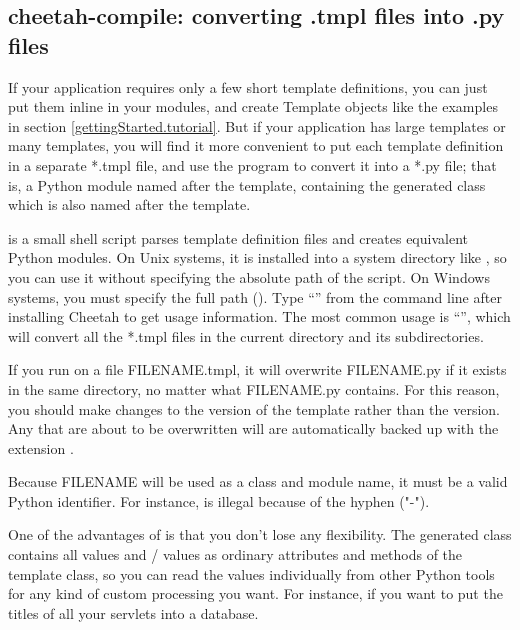 \subsection{cheetah-compile: converting .tmpl files into .py files}
\label{howWorks.tmpl2py}
\label{howWorks.cheetah-compile}

If your application requires only a few short template definitions, you can
just put them inline in your modules, and create Template objects like the
examples in section \ref{gettingStarted.tutorial}.  But if your application
has large templates or many templates, you will find it more convenient to
put each template definition in a separate *.tmpl file, and use the
 program to convert it into a *.py file; that is, a
Python module named after the template, containing the generated class
which is also named after the template.  

 is a small shell script parses template definition
files and creates equivalent Python modules.  On Unix systems, it is installed
into a system directory like , so you can use it without
specifying the absolute path of the script.  On Windows systems, you must
specify the full path (). Type
``'' from the command line after installing Cheetah to
get usage information.  The most common usage is ``'',
which will convert all the *.tmpl files in the current directory
and its subdirectories.

If you run  on a file FILENAME.tmpl, it will
overwrite FILENAME.py if it exists in the same directory, no matter what
FILENAME.py contains.  For this reason, you should make changes to the
 version of the template rather than the  version.  Any
 that are about to be overwritten will are
automatically backed up with the extension .

Because FILENAME will be used as a class and module name, it must be a valid
Python identifier.  For instance,  is 
illegal because of the hyphen ("-").

One of the advantages of  is that you don't lose any
flexibility.  The generated class contains all  values and
/ values as ordinary attributes and methods of the
template class, so you can read the values individually from other Python
tools for any kind of custom processing you want.  For instance, if you want to
put the titles of all your servlets into a database.

